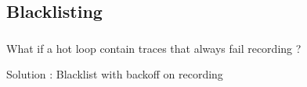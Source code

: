 \documentclass[mathserif,10pt]{beamer}
\newcommand{\cmt}[1]{}
\begin{document}
{
  \frametitle{\subsecname}
  \begin{figure}[h]
  \centering
  \end{figure}
}
\frame
{
  \frametitle{\subsecname}
  \begin{figure}[h]
  \centering
  \end{figure}
}
\subsection{Blacklisting}
\frame
{
  \frametitle{\subsecname}
  \begin{itemize}
   \item What if a hot loop contain traces that always fail recording ? 
    { \item Solution : Blacklist with backoff on recording }
   \end{itemize}
}
\cmt{recording overhead is huge.}
\end{document}
